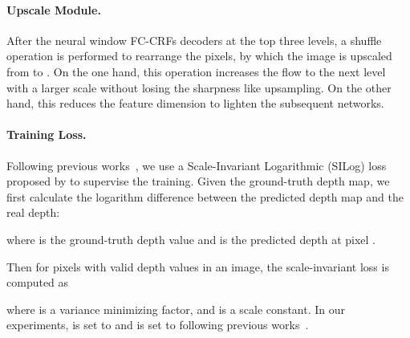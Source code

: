 \documentclass[10pt,twocolumn,letterpaper]{article}
\begin{document}
\vspace{-3mm}
\paragraph{Upscale Module.}
After the neural window FC-CRFs decoders at the top three levels, a shuffle operation is performed to rearrange the pixels, by which the image is upscaled from  to . On the one hand, this operation increases the flow to the next level with a larger scale without losing the sharpness like upsampling. On the other hand, this reduces the feature dimension to lighten the subsequent networks. 



\vspace{-3mm}
\paragraph{Training Loss.}

Following previous works~\cite{lee2019big, bhat2021adabins, lee2021patch}, we use a Scale-Invariant Logarithmic (SILog) loss proposed by \cite{eigen2014depth} to supervise the training. Given the ground-truth depth map, we first calculate the logarithm difference between the predicted depth map and the real depth:

where  is the ground-truth depth value and  is the predicted depth at pixel .

Then for  pixels with valid depth values in an image, the scale-invariant loss is computed as

where  is a variance minimizing factor, and  is a scale constant.
In our experiments,  is set to  and  is set to  following previous works~\cite{lee2019big}.






 
\end{document}
